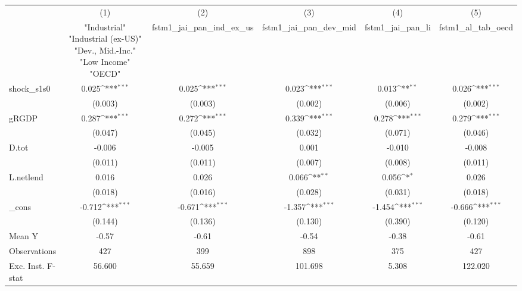 {
\def\sym#1{\ifmmode^{#1}\else\(^{#1}\)\fi}
\begin{tabular}{l*{5}{c}}
\toprule
            &\multicolumn{1}{c}{(1)}&\multicolumn{1}{c}{(2)}&\multicolumn{1}{c}{(3)}&\multicolumn{1}{c}{(4)}&\multicolumn{1}{c}{(5)}\\
            &\multicolumn{1}{c}{ "Industrial" "Industrial (ex-US)" "Dev., Mid.-Inc." "Low Income" "OECD" }&\multicolumn{1}{c}{fstm1\_jai\_pan\_ind\_ex\_us}&\multicolumn{1}{c}{fstm1\_jai\_pan\_dev\_mid}&\multicolumn{1}{c}{fstm1\_jai\_pan\_li}&\multicolumn{1}{c}{fstm1\_al\_tab\_oecd}\\
\midrule
shock\_s1s0  &       0.025\sym{***}&       0.025\sym{***}&       0.023\sym{***}&       0.013\sym{**} &       0.026\sym{***}\\
            &     (0.003)         &     (0.003)         &     (0.002)         &     (0.006)         &     (0.002)         \\
\addlinespace
gRGDP       &       0.287\sym{***}&       0.272\sym{***}&       0.339\sym{***}&       0.278\sym{***}&       0.279\sym{***}\\
            &     (0.047)         &     (0.045)         &     (0.032)         &     (0.071)         &     (0.046)         \\
\addlinespace
D.tot       &      -0.006         &      -0.005         &       0.001         &      -0.010         &      -0.008         \\
            &     (0.011)         &     (0.011)         &     (0.007)         &     (0.008)         &     (0.011)         \\
\addlinespace
L.netlend   &       0.016         &       0.026         &       0.066\sym{**} &       0.056\sym{*}  &       0.026         \\
            &     (0.018)         &     (0.016)         &     (0.028)         &     (0.031)         &     (0.018)         \\
\addlinespace
\_cons      &      -0.712\sym{***}&      -0.671\sym{***}&      -1.357\sym{***}&      -1.454\sym{***}&      -0.666\sym{***}\\
            &     (0.144)         &     (0.136)         &     (0.130)         &     (0.390)         &     (0.120)         \\
\midrule
Mean Y      &       -0.57         &       -0.61         &       -0.54         &       -0.38         &       -0.61         \\
Observations&         427         &         399         &         898         &         375         &         427         \\
Exc. Inst. F-stat&      56.600         &      55.659         &     101.698         &       5.308         &     122.020         \\
\bottomrule
\end{tabular}
}
